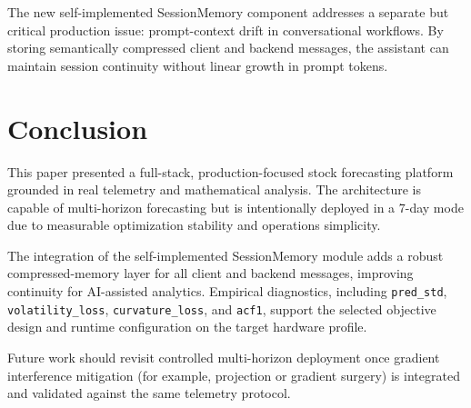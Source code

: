 \documentclass{article}
\begin{document}
The new self-implemented SessionMemory component addresses a separate but critical production issue: prompt-context drift in conversational workflows. By storing semantically compressed client and backend messages, the assistant can maintain session continuity without linear growth in prompt tokens.

\section{Conclusion}
This paper presented a full-stack, production-focused stock forecasting platform grounded in real telemetry and mathematical analysis. The architecture is capable of multi-horizon forecasting but is intentionally deployed in a 7-day mode due to measurable optimization stability and operations simplicity.

The integration of the self-implemented SessionMemory module adds a robust compressed-memory layer for all client and backend messages, improving continuity for AI-assisted analytics. Empirical diagnostics, including \texttt{pred\_std}, \texttt{volatility\_loss}, \texttt{curvature\_loss}, and \texttt{acf1}, support the selected objective design and runtime configuration on the target hardware profile.

Future work should revisit controlled multi-horizon deployment once gradient interference mitigation (for example, projection or gradient surgery) is integrated and validated against the same telemetry protocol.
\end{document}
